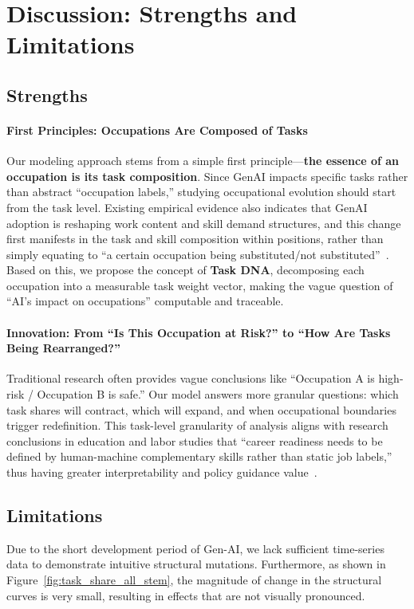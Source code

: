 \section{Discussion: Strengths and Limitations}
\subsection{Strengths}

\paragraph{First Principles: Occupations Are Composed of Tasks}
Our modeling approach stems from a simple first principle---\textbf{the essence of an occupation is its task composition}. Since GenAI impacts specific tasks rather than abstract ``occupation labels,'' studying occupational evolution should start from the task level. Existing empirical evidence also indicates that GenAI adoption is reshaping work content and skill demand structures, and this change first manifests in the task and skill composition within positions, rather than simply equating to ``a certain occupation being substituted/not substituted''~\citep{gulati2025generativeaiadopti}. Based on this, we propose the concept of \textbf{Task DNA}, decomposing each occupation into a measurable task weight vector, making the vague question of ``AI's impact on occupations'' computable and traceable.

\paragraph{Innovation: From ``Is This Occupation at Risk?'' to ``How Are Tasks Being Rearranged?''}
Traditional research often provides vague conclusions like ``Occupation A is high-risk / Occupation B is safe.'' Our model answers more granular questions: which task shares will contract, which will expand, and when occupational boundaries trigger redefinition. This task-level granularity of analysis aligns with research conclusions in education and labor studies that ``career readiness needs to be defined by human-machine complementary skills rather than static job labels,'' thus having greater interpretability and policy guidance value~\citep{mughal2025beyondautomationho,wong2025thefutureoflearnin}.

\subsection{Limitations}
Due to the short development period of Gen-AI, we lack sufficient time-series data to demonstrate intuitive structural mutations.
Furthermore, as shown in Figure~\ref{fig:task_share_all_stem}, the magnitude of change in the structural curves is very small, resulting in effects that are not visually pronounced.

